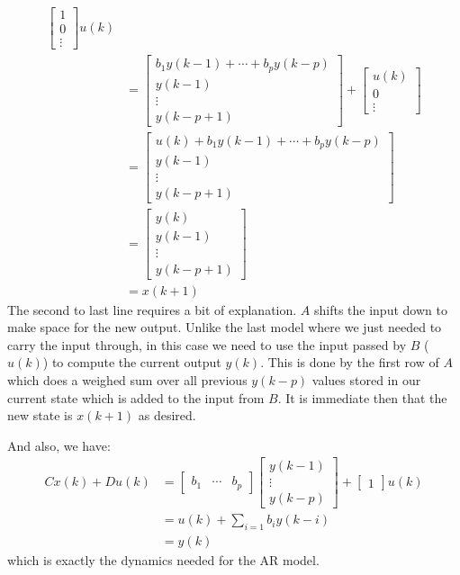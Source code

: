 \documentclass[12pt]{exam}
\begin{document}
\begin{questions}
\begin{solution}
\begin{align*}
\begin{bmatrix}
      1 \\
      0 \\
      \vdots
    \end{bmatrix} u(k) \\
  &= 
    \begin{bmatrix}
      b_1y(k-1) + \cdots + b_py(k-p) \\
      y(k-1) \\
      \vdots \\
      y(k-p + 1)
    \end{bmatrix} + 
    \begin{bmatrix} 
      u(k) \\
      0 \\
      \vdots
    \end{bmatrix} \\
  &=  \begin{bmatrix}
      u(k) + b_1y(k-1) + \cdots + b_py(k-p) \\
      y(k-1) \\
      \vdots \\
      y(k-p + 1)
    \end{bmatrix} \\
  &= \begin{bmatrix}
      y(k) \\
      y(k-1) \\
      \vdots \\
      y(k-p + 1)
    \end{bmatrix} \\
  &= x(k+1)
\end{align*}
The second to last line requires a bit of explanation. $A$ shifts the input down to make space for the new output. Unlike the last model where we just needed to carry the input through, in this case we need to use the input passed by $B$ ($u(k)$) to compute the current output $y(k)$. This is done by the first row of $A$ which does a weighed sum over all previous $y(k - p)$ values stored in our current state which is added to the input from $B$. It is immediate then that the new state is $x(k+1)$ as desired. 

And also, we have:
\begin{align*}
  Cx(k) + Du(k) &=
    \begin{bmatrix}
      b_1 & \cdots & b_p
    \end{bmatrix}
    \begin{bmatrix}
      y(k-1) \\
      \vdots \\
      y(k-p)
    \end{bmatrix} +
    \begin{bmatrix}
      1
    \end{bmatrix}
    u(k) \\
  &= u(k) + \sum_{i=1} b_i y(k - i) \\
  &= y(k)
\end{align*}
which is exactly the dynamics needed for the AR model.


\end{solution}
\end{questions}
\end{document}
